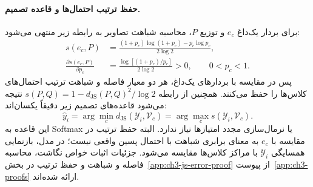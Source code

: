 \paragraph{حفظ ترتیب احتمال‌ها و قاعده تصمیم.}
برای بردار یک‌داغ $e_c$ و توزیع $P$، محاسبه شباهت تصاویر به رابطه زیر منتهی می‌شود:
\begin{equation}\label{eq:ch3-js-onehot-order}
\begin{aligned}
s(e_c,P)
&=\frac{(1+p_c)\log(1+p_c)-p_c\log p_c}{2\log2},\\[4pt]
\frac{\partial s(e_c,P)}{\partial p_c}
&=\frac{\log[(1+p_c)/p_c]}{2\log2}>0,
\qquad 0<p_c<1.
\end{aligned}
\end{equation}
پس در مقایسه با بردارهای یک‌داغ، هر دو معیار فاصله و شباهت ترتیب احتمال‌های کلاس‌ها را حفظ می‌کنند. همچنین از رابطه $s(P,Q)=1-d_{\mathrm{JS}}(P,Q)^2/\log2$ نتیجه می‌شود قاعده‌های تصمیم زیر دقیقاً یکسان‌اند:
\begin{equation}\label{eq:ch3-js-decision}
\boxed{
\widehat y_i
=\arg\min_c d_{\mathrm{JS}}(\mathscr Y_i,\mathcal V_c)
=\arg\max_c s(\mathscr Y_i,\mathcal V_c).
}
\end{equation}
این قاعده به Softmax یا نرمال‌سازی مجدد امتیازها نیاز ندارد. البته حفظ ترتیب در مقایسه با $e_c$ به معنای برابری شباهت با احتمال پسین واقعی نیست؛ در مدل، بازنمایی همسایگی $\mathscr Y_i$ با مراکز کلاس‌ها مقایسه می‌شود. جزئیات اثبات خواص نگاشت، محاسبه فاصله و شباهت و حفظ ترتیب در بخش~\ref{app:ch3-js-error-proof} از پیوست~\ref{app:ch3-proofs} ارائه شده‌اند.

